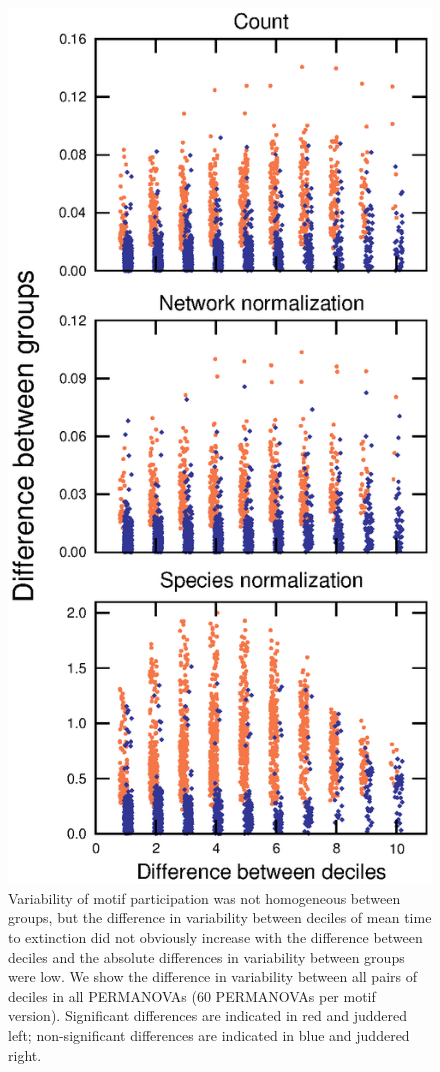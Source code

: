 \documentclass[12pt]{article}
\begin{document}
\begin{spacing}{2.0}
        \begin{figure}[hb!]
            \centering
            \includegraphics[height=.75\textheight]{figures/Tukey_differences.eps}
            \caption{Variability of motif participation was not homogeneous between groups, but the difference in variability between deciles of mean time to extinction did not obviously increase with the difference between deciles and the absolute differences in variability between groups were low. We show the difference in variability between all pairs of deciles in all PERMANOVAs (60 PERMANOVAs per motif version). Significant differences are indicated in red and juddered left; non-significant differences are indicated in blue and juddered right.}
            \label{fig:betadisper_Tukey}
        \end{figure}


\end{spacing}
\end{document}
